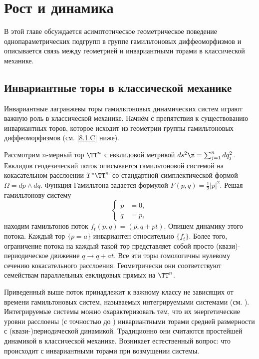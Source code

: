 \chapter{Рост и динамика}

В этой главе обсуждается асимптотическое геометрическое поведение
однопараметрических подгрупп в группе гамильтоновых диффеоморфизмов и
описывается связь между геометрией и инвариантными торами в
классической механике. 

\section{Инвариантные торы в классической механике}

Инвариантные лагранжевы торы гамильтоновых динамических систем играют
важную роль в классической механике. 
Начнём с препятствия к существованию инвариантных торов, которое
исходит из геометрии группы гамильтоновых диффеоморфизмов
(см. \ref{8.1.C} ниже). 

Рассмотрим $n$-мерный тор $\TT^n$ с евклидовой метрикой $ds^2 \z=
\sum^n_{j = 1} dq_j^2$. 
Евклидов геодезический поток описывается гамильтоновой системой на
кокасательном расслоении $T^\ast \TT^n$ со стандартной симплектической
формой $\Omega = dp \wedge dq$. 
Функция Гамильтона задается формулой $F (p, q) = \tfrac12 | p |^2$.
Решая гамильтонову систему 
\[
\begin{cases}
\dot p &= 0,\\
\dot q &= p,
\end{cases}
\]
находим гамильтонов поток $f_t (p, q) = (p, q + pt)$.
Опишем динамику этого потока.
Каждый тор $\{p = a\}$ инвариантен относительно $\{f_t\}$. 
Более того, ограничение потока на каждый такой тор представляет собой
просто (квази)-периодическое движение $q \to q + at$. 
Все эти торы гомологичны нулевому сечению кокасательного расслоения.
Геометрически они соответствуют семействам параллельных евклидовых
прямых на $\TT^n$. 

Приведенный выше поток принадлежит к важному классу не зависящих от времени гамильтоновых систем, называемых интегрируемыми системами (см. \cite{Ar}).
Интегрируемые системы можно охарактеризовать тем, что их энергетические уровни расслоены (с точностью до ) инвариантными торами средней размерности с (квази-)периодической динамикой.
Традиционно они считаются простейшей динамикой в классической механике.
Возникает естественный вопрос: что происходит с инвариантными торами при возмущении системы.

